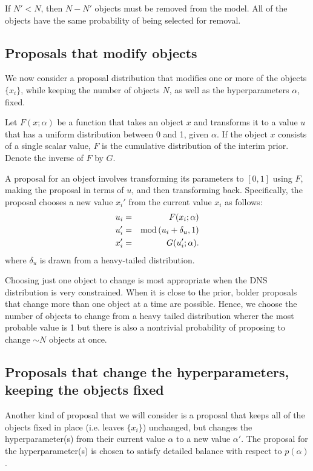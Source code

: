 \documentclass[letterpaper, 11pt]{article}
\begin{document}
If $N' < N$, then $N - N'$ objects must be removed from the model. All
of the objects have the same probability of being selected for removal.

\subsection{Proposals that modify objects}
We now consider a proposal distribution that modifies one or more of the
objects $\{x_i\}$, while keeping the number of objects $N$, as well as the
hyperparameters $\alpha$, fixed.

Let $F(x; \alpha)$ be a function that takes an object $x$ and transforms it
to a value $u$ that has a uniform distribution between 0 and 1, given $\alpha$.
If the object $x$ consists of a single scalar value, $F$ is the cumulative
distribution of the interim prior. Denote the inverse of $F$ by $G$.

A proposal
for an object involves transforming its parameters to $[0, 1]$ using $F$,
making the proposal in terms of $u$, and then transforming back.
Specifically, the proposal chooses
a new value $x_i'$ from the current value $x_i$ as follows:
\begin{eqnarray}
u_i &=& F(x_i; \alpha)\\
u_i' &=& \textnormal{mod}\left(u_i + \delta_u, 1\right)\\
x_i' &=& G(u_i'; \alpha).
\end{eqnarray}
where $\delta_u$ is drawn from a heavy-tailed distribution.

Choosing just one object to change is most appropriate when the DNS
distribution is very constrained. When it is close to the prior, bolder
proposals that change more than one object at a time are possible. Hence,
we choose the number of objects to change from a heavy tailed distribution
wherer the most probable value is 1 but there is also a nontrivial probability
of proposing to change $\sim N$ objects at once.

\subsection{Proposals that change the hyperparameters, keeping the objects fixed}
Another kind of proposal that we will consider is a proposal that keeps all of
the objects fixed in place (i.e. leaves $\{x_i\}$) unchanged, but changes
the hyperparameter(s) from their current value $\alpha$
to a new value $\alpha'$. The proposal for the hyperparameter(s) is chosen
to satisfy detailed balance with respect to $p(\alpha)$.
\end{document}
